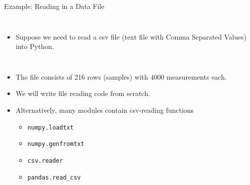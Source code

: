 \documentclass[10pt, aspectratio=169]{beamer} %
\begin{document}
\begin{frame}[fragile]
 {Example: Reading in a Data File}
\begin{columns}
\begin{itemize}
\item Suppose we need to read a csv file (text file with Comma Separated Values) into Python.
\end{itemize}
\end{columns}
\begin{itemize}
\item The file consists of 216 rows (samples) with 4000 measurements each.
\item We will write file reading code from scratch.
\item Alternatively, many modules contain csv-reading functions
\begin{itemize}
\item \verb+numpy.loadtxt+
\item \verb+numpy.genfromtxt+
\item \verb+csv.reader+
\item \verb+pandas.read_csv+
\end{itemize}
\end{itemize}
\end{frame}
\end{document}
